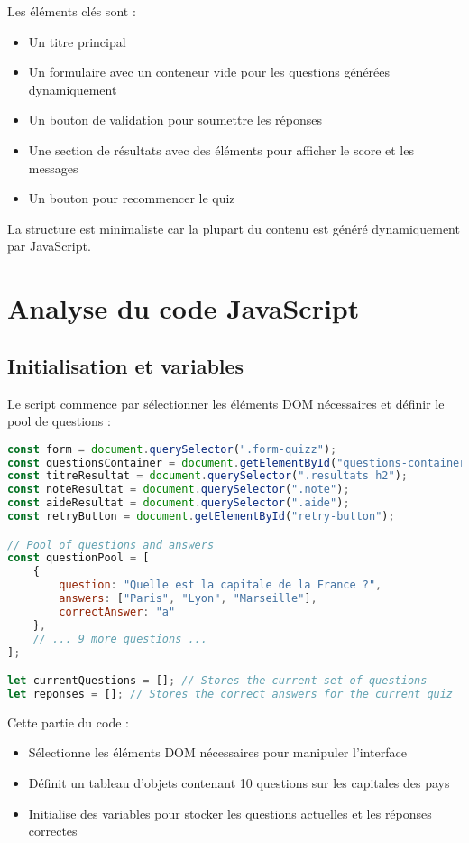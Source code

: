 \documentclass{article}
\begin{document}
Les éléments clés sont :
\begin{itemize}
    \item Un titre principal
    \item Un formulaire avec un conteneur vide pour les questions générées dynamiquement
    \item Un bouton de validation pour soumettre les réponses
    \item Une section de résultats avec des éléments pour afficher le score et les messages
    \item Un bouton pour recommencer le quiz
\end{itemize}

La structure est minimaliste car la plupart du contenu est généré dynamiquement par JavaScript.

\section{Analyse du code JavaScript}

\subsection{Initialisation et variables}
Le script commence par sélectionner les éléments DOM nécessaires et définir le pool de questions :

\begin{lstlisting}[language=JavaScript]
const form = document.querySelector(".form-quizz");
const questionsContainer = document.getElementById("questions-container");
const titreResultat = document.querySelector(".resultats h2");
const noteResultat = document.querySelector(".note");
const aideResultat = document.querySelector(".aide");
const retryButton = document.getElementById("retry-button");

// Pool of questions and answers
const questionPool = [
    {
        question: "Quelle est la capitale de la France ?",
        answers: ["Paris", "Lyon", "Marseille"],
        correctAnswer: "a"
    },
    // ... 9 more questions ...
];

let currentQuestions = []; // Stores the current set of questions
let reponses = []; // Stores the correct answers for the current quiz
\end{lstlisting}

Cette partie du code :
\begin{itemize}
    \item Sélectionne les éléments DOM nécessaires pour manipuler l'interface
    \item Définit un tableau d'objets contenant 10 questions sur les capitales des pays
    \item Initialise des variables pour stocker les questions actuelles et les réponses correctes
\end{itemize}
\end{document}
